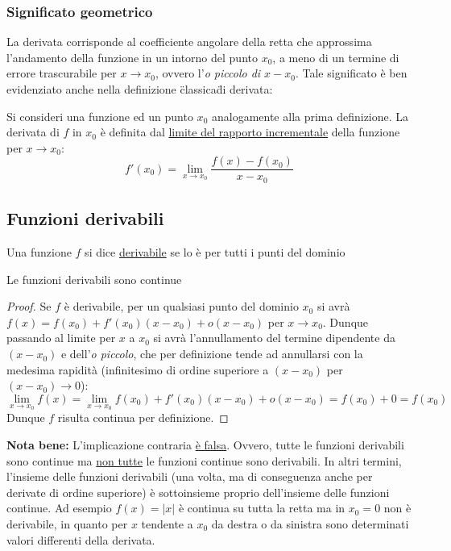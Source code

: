 \documentclass[10pt, oneside]{book}
\theoremstyle{plain}
\begin{document}
\subsubsection{Significato geometrico} 
La derivata corrisponde al coefficiente angolare della retta che approssima l'andamento della funzione in un intorno del punto $x_0$, a meno di un termine di errore trascurabile per $x \rightarrow x_0$, ovvero l'\textit{o piccolo di $x - x_0$}.
Tale significato è ben evidenziato anche nella definizione \"classica\" di derivata:
\begin{defin} Si consideri una funzione ed un punto $x_0$ analogamente alla prima definizione. La derivata di $f$ in $x_0$ è definita dal \underline{limite del rapporto incrementale} della funzione per $x \rightarrow x_0$:
\[f'(x_0) = \lim \limits_{x \rightarrow x_0} \frac{f(x) - f(x_0)}{x - x_0}\]
\end{defin}

\subsection{Funzioni derivabili}
\label{subsubsec:derivabili}
\begin{defin}
Una funzione $f$ si dice \underline{derivabile} se lo è per tutti i punti del dominio
\end{defin}
\begin{prop}
Le funzioni derivabili sono continue
\end{prop}
\begin{proof}
Se $f$ è derivabile, per un qualsiasi punto del dominio $x_0$ si avrà $f(x) = f(x_0) + f'(x_0) (x - x_0) + o (x- x_0)$ per $x \rightarrow x_0$. Dunque passando al limite per $x$ a $x_0$ si avrà l'annullamento del termine dipendente da $(x-x_0)$ e dell'\textit{o piccolo}, che per definizione tende ad annullarsi con la medesima rapidità (infinitesimo di ordine superiore a $(x - x_0)$ per $(x - x_0) \rightarrow 0$):
\[\lim \limits_{x \rightarrow x_0} f(x) = \lim \limits_{x \rightarrow x_0} f(x_0) + f'(x_0) (x - x_0) + o (x- x_0) = f(x_0) + 0 = f(x_0)\]
Dunque $f$ risulta continua per definizione.
\end{proof}
\textbf{Nota bene:} L'implicazione contraria \underline{è falsa}. Ovvero, tutte le funzioni derivabili sono continue ma \underline{non tutte} le funzioni continue sono derivabili. In altri termini, l'insieme delle funzioni derivabili (una volta, ma di conseguenza anche per derivate di ordine superiore) è sottoinsieme proprio dell'insieme delle funzioni continue.
Ad esempio $f(x) = |x|$ è continua su tutta la retta ma in $x_0 = 0$ non è derivabile, in quanto per $x$ tendente a $x_0$ da destra o da sinistra sono determinati valori differenti della derivata.
\end{document}
